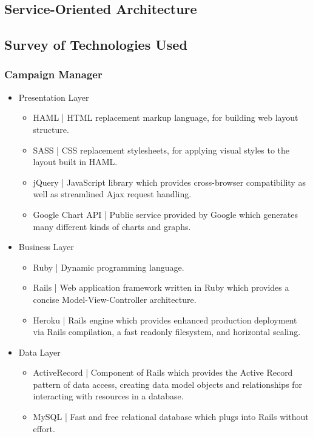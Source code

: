 \documentclass{article}
\begin{document}
\subsection{Service-Oriented Architecture}
\subsection{Survey of Technologies Used}
\subsubsection{Campaign Manager}
\begin{itemize}
\item Presentation Layer
  \begin{itemize}
  \item HAML | HTML replacement markup language, for building web layout structure.
  \item SASS | CSS replacement stylesheets, for applying visual styles to the layout built in HAML.
  \item jQuery | JavaScript library which provides cross-browser compatibility as well as streamlined Ajax request handling.
  \item Google Chart API | Public service provided by Google which generates many different kinds of charts and graphs.
  \end{itemize}
\item Business Layer
  \begin{itemize}
  \item Ruby | Dynamic programming language.
  \item Rails | Web application framework written in Ruby which provides a concise Model-View-Controller architecture.
  \item Heroku | Rails engine which provides enhanced production deployment via Rails compilation, a fast readonly filesystem, and horizontal scaling.
  \end{itemize}
\item Data Layer
  \begin{itemize}
  \item ActiveRecord | Component of Rails which provides the Active Record pattern of data access, creating data model objects and relationships for interacting with resources in a database.
  \item MySQL | Fast and free relational database which plugs into Rails without effort.
  \end{itemize}
\end{itemize}
\end{document}
